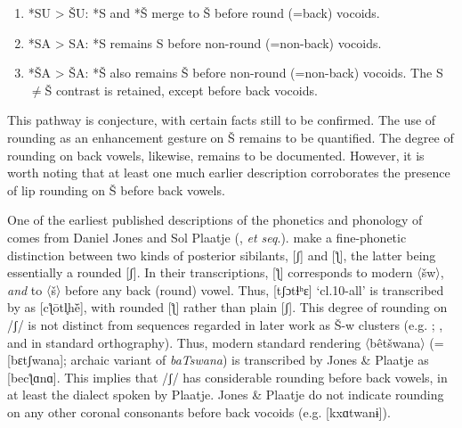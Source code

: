 \documentclass[output=paper,newtxmath,modfonts,nonflat]{langsci/langscibook}
\begin{document}
\begin{enumerate}
\begin{enumerate}
\item *SU > ŠU: *S and *Š merge to Š before round (=back) vocoids.
\item *SA > SA: *S remains S before non-round (=non-back) vocoids.
\item *ŠA > ŠA: *Š also remains Š before non-round (=non-back) vocoids. The S${\neq}$Š contrast is retained, except before back vocoids.
\end{enumerate}

\end{enumerate}

This pathway is conjecture, with certain facts still to be confirmed. The use of rounding as an enhancement gesture on Š remains to be quantified. The degree of rounding on back vowels, likewise, remains to be documented. However, it is worth noting that at least one much earlier description corroborates the presence of lip rounding on Š before back vowels.

One of the earliest published descriptions of the phonetics and phonology of  comes from Daniel Jones and Sol Plaatje (\citealt{Jones&Plaatje1916}, \textit{et seq}.). \citet[xx.32]{Jones&Plaatje1916} make a fine-phonetic distinction between two kinds of posterior sibilants, [ʃ] and [ƪ], the latter being essentially a rounded [ʃ]. In their transcriptions, [ƪ] corresponds to modern 〈šw〉, \textit{and} to 〈š〉 before any back (round) vowel.  Thus, [tʃɔtɬʰɛ] ‘cl.10-all’ is transcribed by \citet[3]{Jones&Plaatje1916} as [cƪ\={o}tl̥h\={e}\v{}], with rounded [ƪ] rather than plain [ʃ]. This degree of rounding on /ʃ/ is not distinct from sequences regarded in later work as Š-w clusters (e.g. \citealt{Cole1955}; \citealt{chebanneetal1997}, and in standard orthography). Thus, modern standard rendering 〈bêtšwana〉 (= [bɛtʃwana]; archaic variant of \textit{baTswana}) is transcribed by Jones \& Plaatje as [becƪɑnɑ]. This implies that /ʃ/ has considerable rounding before back vowels, in at least the  dialect spoken by Plaatje. Jones \& Plaatje do not indicate rounding on any other coronal consonants before back vocoids (e.g. [kxɑtwanɨ]).
\end{document}
